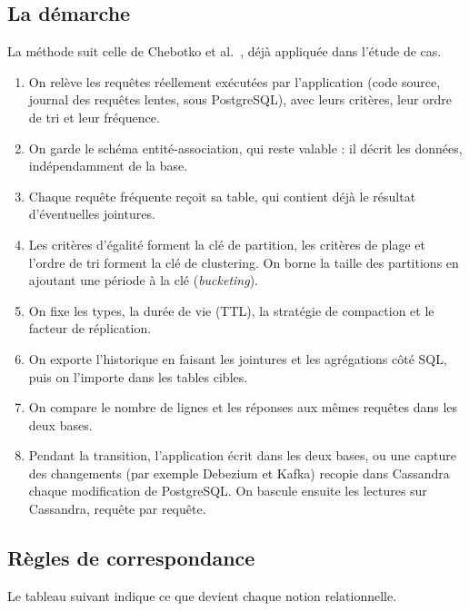 \documentclass[11pt,a4paper]{article}
\newcommand{\cq}[1]{\texttt{\detokenize{#1}}}
\begin{document}
\subsection{La démarche}
La méthode suit celle de Chebotko et al.\ \cite{chebotko}, déjà appliquée dans l'étude de cas.
\begin{enumerate}
  \item On relève les requêtes réellement exécutées par l'application (code source, journal des requêtes lentes, \cq{pg_stat_statements} sous PostgreSQL), avec leurs critères, leur ordre de tri et leur fréquence.
  \item On garde le schéma entité-association, qui reste valable : il décrit les données, indépendamment de la base.
  \item Chaque requête fréquente reçoit sa table, qui contient déjà le résultat d'éventuelles jointures.
  \item Les critères d'égalité forment la clé de partition, les critères de plage et l'ordre de tri forment la clé de clustering. On borne la taille des partitions en ajoutant une période à la clé (\emph{bucketing}).
  \item On fixe les types, la durée de vie (TTL), la stratégie de compaction et le facteur de réplication.
  \item On exporte l'historique en faisant les jointures et les agrégations côté SQL, puis on l'importe dans les tables cibles.
  \item On compare le nombre de lignes et les réponses aux mêmes requêtes dans les deux bases.
  \item Pendant la transition, l'application écrit dans les deux bases, ou une capture des changements (par exemple Debezium et Kafka) recopie dans Cassandra chaque modification de PostgreSQL. On bascule ensuite les lectures sur Cassandra, requête par requête.
\end{enumerate}

\subsection{Règles de correspondance}
Le tableau suivant indique ce que devient chaque notion relationnelle.
\end{document}
